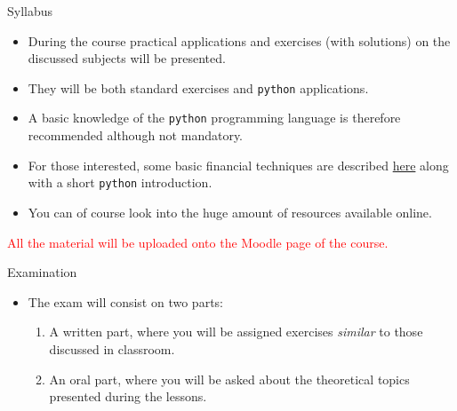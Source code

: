 \documentclass{beamer}
\begin{document}
\begin{frame}{Syllabus}
	\begin{itemize}	
		\item During the course practical applications and exercises (with solutions) on the discussed subjects will be presented.
		\item They will be both standard exercises and \texttt{python} applications.
		\item A basic knowledge of the \texttt{python} programming language is therefore recommended although not mandatory.
		\item For those interested, some basic financial techniques are described \href{https://drive.google.com/file/d/1GnlyuB4KkUbzqL7tf6nju-ZEqnfQrRa4/view?usp=drive_link}{here} along with a short \texttt{python} introduction.
		\item You can of course look into the huge amount of resources available online.
	\end{itemize}
	\begin{center}
	\textcolor{red}{All the material will be uploaded onto the Moodle page of the course.}
	\end{center}
\end{frame}

\begin{frame}{Examination}
	\begin{itemize}	
		\item The exam will consist on two parts: 
		\begin{enumerate}
			\item A written part, where you will be assigned exercises \emph{similar} to those discussed in classroom.
			\item An oral part, where you will be asked about the theoretical topics presented during the lessons.
		\end{enumerate} 
	\end{itemize}
\end{frame}
\end{document}
